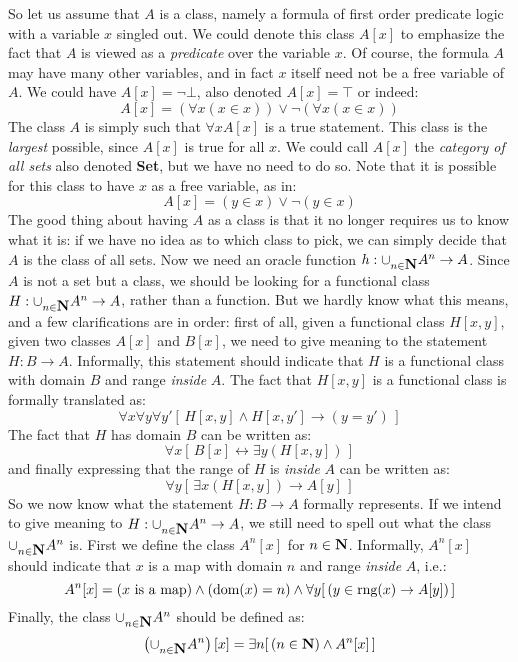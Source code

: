 So let us assume that $A$ is a class, namely a formula of first
order predicate logic with a variable $x$ singled out. We could
denote this class $A[x]$ to emphasize the fact that $A$ is viewed as
a {\em predicate} over the variable $x$. Of course, the formula $A$
may have many other variables, and in fact $x$ itself need not be a
free variable of $A$. We could have $A[x]=\lnot\bot$, also denoted
$A[x]=\top$ or indeed:
    \[
    A[x]=(\forall x (x\in x))\lor\lnot(\forall x(x\in x))
    \]
The class $A$ is simply such that $\forall x A[x]$ is a true
statement. This class is the {\em largest} possible, since $A[x]$ is
true for all $x$. We could call $A[x]$ the {\em category of all
sets} also denoted {\bf Set}, but we have no need to do so. Note
that it is possible for this class to have $x$ as a free variable,
as in:
    \[
    A[x] = (y\in x)\lor\lnot(y\in x)
    \]
The good thing about having $A$ as a class is that it no longer
requires us to know what it is: if we have no idea as to which class
to pick, we can simply decide that $A$ is the class of all sets. Now
we need an oracle function $h:\cup_{n\in\mbox{$\bf N$}}A^{n}\to A$. Since $A$ is
not a set but a class, we should be looking for a functional class
$H:\cup_{n\in\mbox{$\bf N$}}A^{n}\to A$, rather than a function. But we hardly
know what this means, and a few clarifications are in order: first
of all, given a functional class $H[x,y]$, given two classes $A[x]$
and $B[x]$, we need to give meaning to the statement $H:B\to A$.
Informally, this statement should indicate that $H$ is a functional
class with domain $B$ and range {\em inside} $A$. The fact that
$H[x,y]$ is a functional class is formally translated as:
    \[
    \forall x\forall y\forall y'[\,H[x,y]\land H[x,y']\to(y=y')\,]
    \]
The fact that $H$ has domain $B$ can be written as:
    \[
    \forall x[\,B[x]\leftrightarrow\exists y(H[x,y])\,]
    \]
and finally expressing that the range of $H$ is {\em inside} $A$ can be written as:
    \[
    \forall y[\,\exists x(H[x,y])\to A[y]\,]
    \]
So we now know what the statement $H:B\to A$ formally represents. If
we intend to give meaning to $H:\cup_{n\in\mbox{$\bf N$}}A^{n}\to A$, we still
need to spell out what the class $\cup_{n\in\mbox{$\bf N$}}A^{n}$ is. First we
define the class $A^{n}[x]$ for $n\in\mbox{$\bf N$}$. Informally, $A^{n}[x]$
should indicate that $x$ is a map with domain $n$ and range {\em
inside} $A$, i.e.:
    \[
    A^{n}[x]=(x\mbox{\ is a map})\land(\mbox{\rm dom}(x)=n)\land\forall y[\,(y\in\mbox{\rm rng}(x)\to A[y])\,]
    \]
Finally, the class $\cup_{n\in\mbox{$\bf N$}}A^{n}$ should be defined as:
    \[
    \left(\cup_{n\in\mbox{$\bf N$}}A^{n}\right)[x]=\exists n[\,(n\in\mbox{$\bf N$})\land A^{n}[x]\,]
    \]

